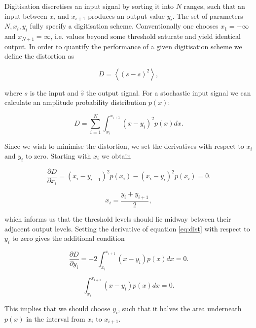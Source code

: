 \documentclass[apj]{emulateapj}
\begin{document}
Digitisation discretises an input signal by sorting it into $N$ ranges, such that an input between $x_i$ and $x_{i+1}$ produces an output value $y_i$. The set of parameters $N, x_i, y_i$ fully specify a digitisation scheme. Conventionally one chooses $x_{1} = -\infty$ and $x_{N+1} = \infty$, i.e. values beyond some threshold saturate and yield identical output. In order to quantify the performance of a given digitisation scheme we define the distortion as

\begin{equation}\label{eq:distdef}
D = \left\langle  \left( s - \hat{s} \right)^2 \right\rangle,
\end{equation}

where $s$ is the input and $\hat{s}$ the output signal. For a stochastic input signal we can calculate an amplitude probability distribution $p(x)$:

\begin{equation} \label{eq:dist}
D = \sum_{i = 1}^N \int_{x_i}^{x_{i+1}} \left(x-y_i\right)^2 p(x) dx.
\end{equation}

Since we wish to minimise the distortion, we set the derivatives with respect to $x_i$ and $y_i$ to zero. Starting with $x_i$ we obtain

\begin{equation} \label{eq:distderiv1}
\frac{\partial D}{\partial x_i} = \left(x_i-y_{i-1}\right)^2 p(x_i) - \left(x_i - y_i\right)^2 p(x_i) = 0.
\end{equation}

\begin{equation} \label{eq:digitequalspacecondition}
x_i = \frac{y_i+y_{i+1}}{2},
\end{equation}

which informs us that the threshold levels should lie midway between their adjacent output levels. Setting the derivative of equation \ref{eq:dist} with respect to $y_i$  to zero gives the additional condition

\begin{equation} \label{eq:distderiv2}
\frac{\partial D}{\partial y_i} = -2 \int_{x_i}^{x_{i+1}} \left( x-y_i \right) p(x) dx = 0.
\end{equation}

\begin{equation} \label{eq:digitareacondition}
\int_{x_i}^{x_{i+1}} \left( x-y_i \right) p(x) dx = 0.
\end{equation}

This implies that we should choose $y_i$, such that it halves the area underneath $p(x)$ in the interval from $x_i$ to $x_{i+1}$.
\end{document}

